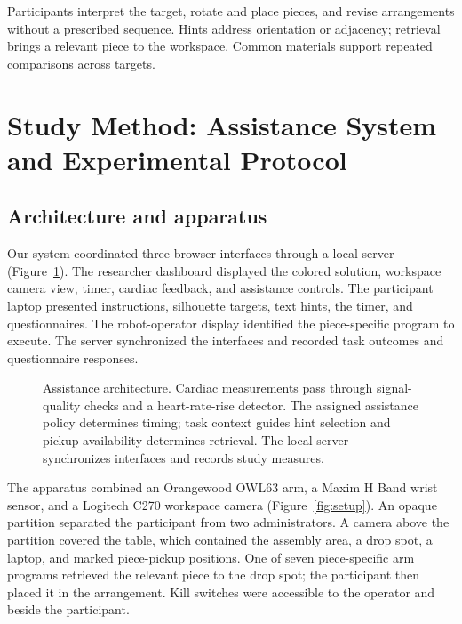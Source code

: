 \documentclass[sigconf,anonymous]{aamas}
\begin{document}
Participants interpret the target, rotate and place pieces, and revise arrangements without a prescribed sequence. Hints address orientation or adjacency; retrieval brings a relevant piece to the workspace. Common materials support repeated comparisons across targets.

\section{Study Method: Assistance System and Experimental Protocol}

\subsection{Architecture and apparatus}

Our system coordinated three browser interfaces through a local server (Figure~\ref{fig:architecture}). The researcher dashboard displayed the colored solution, workspace camera view, timer, cardiac feedback, and assistance controls. The participant laptop presented instructions, silhouette targets, text hints, the timer, and questionnaires. The robot-operator display identified the piece-specific program to execute. The server synchronized the interfaces and recorded task outcomes and questionnaire responses.

\begin{figure}[t]
\centering
\begingroup
\renewcommand{\footnotesize}{\fontsize{10}{11}\selectfont}
\renewcommand{\scriptsize}{\fontsize{8.5}{9.5}\selectfont}
\renewcommand{\small}{\fontsize{10}{11}\selectfont}
\resizebox{.95\textwidth}{!}{}
\endgroup
\caption{Assistance architecture. Cardiac measurements pass through signal-quality checks and a heart-rate-rise detector. The assigned assistance policy determines timing; task context guides hint selection and pickup availability determines retrieval. The local server synchronizes interfaces and records study measures.}
\label{fig:architecture}
\end{figure}

The apparatus combined an Orangewood OWL63 arm, a Maxim H Band wrist sensor, and a Logitech C270 workspace camera (Figure~\ref{fig:setup}). An opaque partition separated the participant from two administrators. A camera above the partition covered the table, which contained the assembly area, a drop spot, a laptop, and marked piece-pickup positions. One of seven piece-specific arm programs retrieved the relevant piece to the drop spot; the participant then placed it in the arrangement. Kill switches were accessible to the operator and beside the participant.
\end{document}

